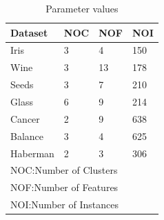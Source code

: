 \documentclass[review]{elsarticle}
\begin{document}
\begin{table}
\caption{Parameter values}
\scriptsize
\begin{center}
\renewcommand{\arraystretch}{.75}
  \begin{tabular}{l l l l}
   
    \hline
\textbf{Dataset} & \textbf{NOC} & \textbf{NOF} &\textbf{NOI}    \\

\hline
Iris	      &	3	&	 4   &	150	\\
Wine	&	3	&	13	&	178	\\
Seeds	&	3	&	7	&	210	\\
Glass	&	6	&	9	&	214	\\
Cancer	&	2	&	9	&	638	\\
Balance	&	3	&	4	&	625	\\
Haberman	&	2	&	3	&	306	\\


    \hline
\multicolumn{4}{l}{NOC:Number of Clusters}\\
\multicolumn{4}{l}{NOF:Number of Features}\\
\multicolumn{4}{l}{NOI:Number of Instances}\\
  \end{tabular}
\end{center}
\label{tab:dataset}
\end{table}
\end{document}
